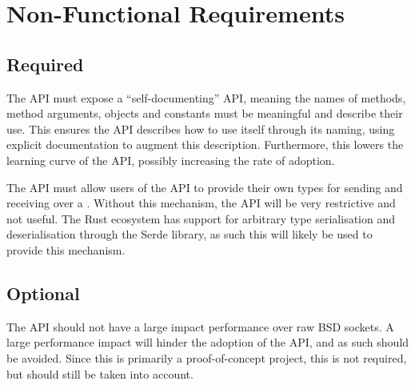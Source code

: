 \section{Non-Functional Requirements}\label{sec:non-functional-requirements}

\subsection{Required}\label{subsec:required2}

The API must expose a “self-documenting” API, meaning the names of methods, method arguments, objects and constants must be
meaningful and describe their use.
This ensures the API describes how to use itself through its naming, using explicit documentation to augment this description.
Furthermore, this lowers the learning curve of the API, possibly increasing the rate of adoption.

The API must allow users of the API to provide their own types for sending and receiving over a \connection{}.
Without this mechanism, the API will be very restrictive and not useful.
The Rust ecosystem has support for arbitrary type serialisation and deserialisation through the Serde library, as such this
will likely be used to provide this mechanism.

\subsection{Optional}\label{subsec:optional2}

The API should not have a large impact performance over raw BSD sockets.
A large performance impact will hinder the adoption of the API, and as such should be avoided.
Since this is primarily a proof-of-concept project, this is not required, but should still be taken into account.


